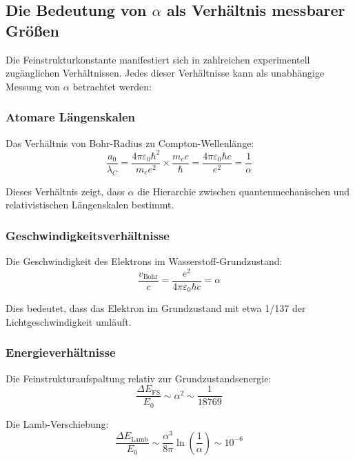 \documentclass[12pt,a4paper]{article}
\theoremstyle{definition}
\begin{document}
	\subsection{Die Bedeutung von $\alpha$ als Verhältnis messbarer Größen}
	
	Die Feinstrukturkonstante manifestiert sich in zahlreichen experimentell zugänglichen Verhältnissen. Jedes dieser Verhältnisse kann als unabhängige Messung von $\alpha$ betrachtet werden:
	
	\subsubsection{Atomare Längenskalen}
	
	Das Verhältnis von Bohr-Radius zu Compton-Wellenlänge:
	\begin{equation}
		\frac{a_0}{\lambda_C} = \frac{4\pi\varepsilon_0\hbar^2}{m_e e^2} \times \frac{m_e c}{\hbar} = \frac{4\pi\varepsilon_0\hbar c}{e^2} = \frac{1}{\alpha}
	\end{equation}
	
	Dieses Verhältnis zeigt, dass $\alpha$ die Hierarchie zwischen quantenmechanischen und relativistischen Längenskalen bestimmt.
	
	\subsubsection{Geschwindigkeitsverhältnisse}
	
	Die Geschwindigkeit des Elektrons im Wasserstoff-Grundzustand:
	\begin{equation}
		\frac{v_{\text{Bohr}}}{c} = \frac{e^2}{4\pi\varepsilon_0\hbar c} = \alpha
	\end{equation}
	
	Dies bedeutet, dass das Elektron im Grundzustand mit etwa 1/137 der Lichtgeschwindigkeit umläuft.
	
	\subsubsection{Energieverhältnisse}
	
	Die Feinstrukturaufspaltung relativ zur Grundzustandsenergie:
	\begin{equation}
		\frac{\Delta E_{\text{FS}}}{E_0} \sim \alpha^2 \sim \frac{1}{18769}
	\end{equation}
	
	Die Lamb-Verschiebung:
	\begin{equation}
		\frac{\Delta E_{\text{Lamb}}}{E_0} \sim \frac{\alpha^3}{8\pi} \ln\left(\frac{1}{\alpha}\right) \sim 10^{-6}
	\end{equation}
	
\end{document}
